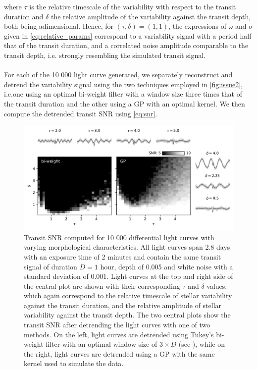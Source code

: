 \documentclass[modern]{aastex631}
\begin{document}
where $\tau$ is the relative timescale of the variability with respect to the transit duration and $\delta$ the relative amplitude of the variability against the transit depth, both being adimensional. Hence, for $(\tau, \delta)=(1, 1)$, the expressions of $\omega$ and $\sigma$ given in \autoref{eq:relative_params} correspond to a variability signal with a period half that of the transit duration, and a correlated noise amplitude comparable to the transit depth, i.e. strongly resembling the simulated transit signal.\\\\
For each of the 10 000 light curve generated, we separately reconstruct and detrend  the variability signal using the two techniques employed in \autoref{fig:issue2}, i.e.\;one using an optimal bi-weight filter with a window size three times that of the transit duration \citep{wotan} and the other using a GP with an optimal kernel. We then compute the detrended transit SNR using \autoref{eq:snr}.
\begin{figure}[H]
    \begin{centering}
        \includegraphics[width=\linewidth]{../workflows/cleaning_snr/figures/result.pdf}
        \caption{Transit SNR computed for 10 000 differential light curves with varying morphological characteristics. All light curves span 2.8 days with an exposure time of 2 minutes and contain the same transit signal of  duration $D=1$ hour, depth of 0.005 and white noise with a standard deviation of 0.001. Light curves at the top and right side of the central plot are shown with their corresponding $\tau$ and $\delta$ values, which again correspond to the relative timescale of stellar variability against the transit duration, and the relative amplitude of stellar variability against the transit depth. The two central plots show the transit SNR after detrending the light curves with one of two methods. On the left, light curves are detrended using Tukey's bi-weight filter with an optimal window size of $3\times D$ (see \citealt{wotan}), while on the right, light curves are detrended using a GP with the same kernel used to simulate the data.}
        \label{fig:snr_detrend}
    \end{centering}
\end{figure}
\end{document}
